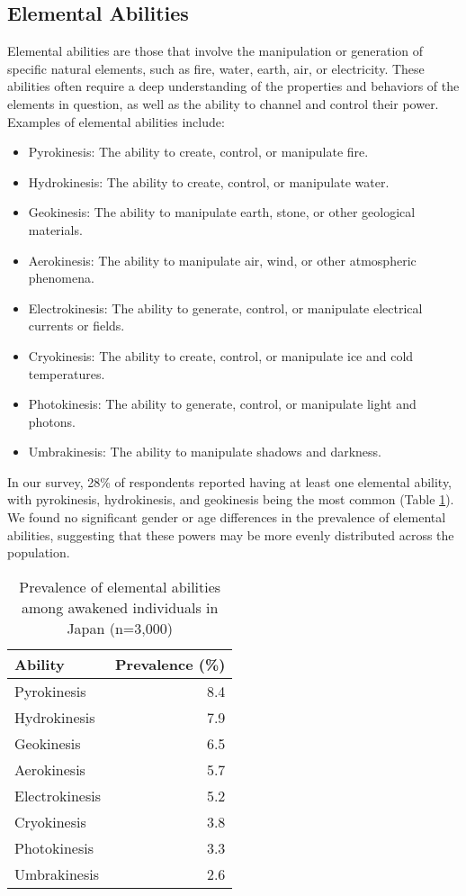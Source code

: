 \documentclass[12pt]{article}
\begin{document}
\subsection{Elemental Abilities}
Elemental abilities are those that involve the manipulation or generation of specific natural elements, such as fire, water, earth, air, or electricity. These abilities often require a deep understanding of the properties and behaviors of the elements in question, as well as the ability to channel and control their power. Examples of elemental abilities include:

\begin{itemize}
    \item Pyrokinesis: The ability to create, control, or manipulate fire.
    \item Hydrokinesis: The ability to create, control, or manipulate water.
    \item Geokinesis: The ability to manipulate earth, stone, or other geological materials.
    \item Aerokinesis: The ability to manipulate air, wind, or other atmospheric phenomena.
    \item Electrokinesis: The ability to generate, control, or manipulate electrical currents or fields.
    \item Cryokinesis: The ability to create, control, or manipulate ice and cold temperatures.
    \item Photokinesis: The ability to generate, control, or manipulate light and photons.
    \item Umbrakinesis: The ability to manipulate shadows and darkness.
\end{itemize}

In our survey, 28\% of respondents reported having at least one elemental ability, with pyrokinesis, hydrokinesis, and geokinesis being the most common (Table \ref{tab:elementalabilities}). We found no significant gender or age differences in the prevalence of elemental abilities, suggesting that these powers may be more evenly distributed across the population.

\begin{table}[h]
\centering
\caption{Prevalence of elemental abilities among awakened individuals in Japan (n=3,000)}
\label{tab:elementalabilities}
\begin{tabular}{lr}
\toprule
Ability & Prevalence (\%) \\
\midrule
Pyrokinesis & 8.4 \\
Hydrokinesis & 7.9 \\
Geokinesis & 6.5 \\
Aerokinesis & 5.7 \\
Electrokinesis & 5.2 \\
Cryokinesis & 3.8 \\
Photokinesis & 3.3 \\
Umbrakinesis & 2.6 \\
\bottomrule
\end{tabular}
\end{table}
\end{document}

